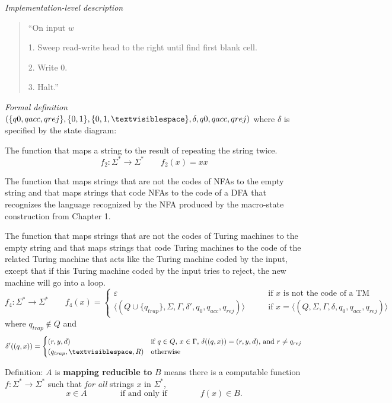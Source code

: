 \documentclass[12pt, oneside]{article}
\begin{document}
{\it Implementation-level description}
\begin{quote}
    ``On input $w$
    
    1. Sweep read-write head to the right until find first blank cell.
    
    2. Write 0.
    
    3. Halt.''
\end{quote}

{\it Formal definition} $(\{q0, qacc, qrej\}, \{0,1\}, \{0,1,\textvisiblespace\},\delta, q0, qacc, qrej)$
where $\delta$ is specified by the state diagram: 


\newpage


The function that maps a string to the result of repeating the string twice.
\[
f_2: \Sigma^* \to \Sigma^* \qquad f_2( x )  =  xx
\]

\vfill


The function that maps strings that are not the codes of NFAs to the empty 
string and that maps strings that code NFAs to the code of a DFA that recognizes
the language recognized by the NFA produced by the macro-state construction from Chapter 1.


\vfill


The function that maps strings that are not the codes of Turing machines to the empty 
string and that maps strings that code Turing machines to the code of the 
related Turing machine that acts like the Turing machine coded by the input, except
that if this Turing machine coded by the input tries to reject, the 
new machine will go into a loop.
\[
f_4: \Sigma^* \to \Sigma^*  \qquad f_4( x )  =   \begin{cases}  \varepsilon \qquad&\text{if $x$ is not the code of  a TM} \\
\langle (Q \cup \{q_{trap} \}, \Sigma, \Gamma, \delta', q_0, q_{acc}, q_{rej} ) \rangle \qquad&\text{if $x = \langle (Q, \Sigma, \Gamma, \delta, q_0, q_{acc}, q_{rej} )\rangle$}\end{cases}
\]
where $q_{trap} \notin Q$ and 
\[\delta'( (q,x) ) = \begin{cases}
(r,y,d) &\text{if $q \in Q$, $x \in \Gamma$, $\delta ((q,x)) = (r,y,d)$, and  $r \neq  q_{rej}$} \\
(q_{trap}, \textvisiblespace, R) & \text{otherwise}
\end{cases}
\]
\vfill
\vfill

\newpage

Definition:  $A$ is  {\bf  mapping  reducible to} $B$  means there is a computable function 
$f : \Sigma^* \to \Sigma^*$ such that {\it for all} strings  $x$ in $\Sigma^*$, 
\[
x  \in  A \qquad \qquad \text{if and  only  if} \qquad \qquad f(x) \in B.
\]
\end{document}
